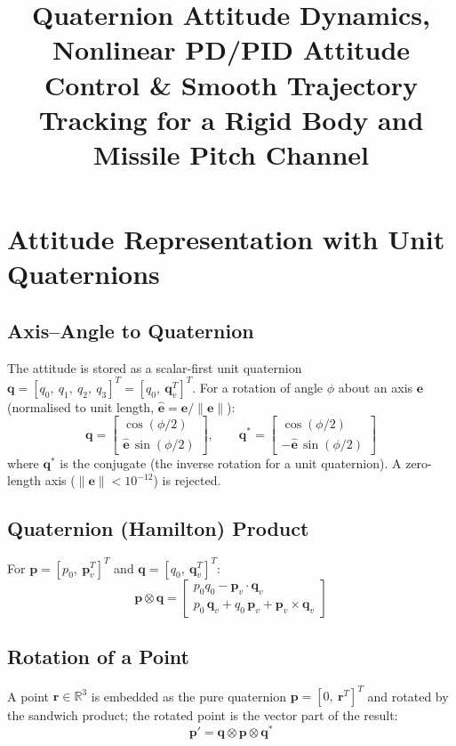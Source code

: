 \documentclass[11pt, a4paper]{article}
\title{\textbf{Quaternion Attitude Dynamics, Nonlinear PD/PID Attitude Control \& Smooth Trajectory Tracking for a Rigid Body and Missile Pitch Channel}}
\author{}
\date{}
\newcommand{\vect}[1]{\boldsymbol{#1}}
\newcommand{\qv}{\vect{q}_v}
\begin{document}
\maketitle

\section{Attitude Representation with Unit Quaternions}

\subsection{Axis--Angle to Quaternion}
The attitude is stored as a scalar-first unit quaternion $\vect{q} = [q_0,\ q_1,\ q_2,\ q_3]^T = [q_0,\ \qv^T]^T$. For a rotation of angle $\phi$ about an axis $\vect{e}$ (normalised to unit length, $\hat{\vect{e}} = \vect{e}/\lVert\vect{e}\rVert$):
\begin{equation}
\vect{q} = \begin{bmatrix} \cos(\phi/2) \\ \hat{\vect{e}}\,\sin(\phi/2) \end{bmatrix},
\qquad
\vect{q}^{*} = \begin{bmatrix} \cos(\phi/2) \\ -\hat{\vect{e}}\,\sin(\phi/2) \end{bmatrix}
\end{equation}
where $\vect{q}^{*}$ is the conjugate (the inverse rotation for a unit quaternion). A zero-length axis ($\lVert\vect{e}\rVert < 10^{-12}$) is rejected.

\subsection{Quaternion (Hamilton) Product}
For $\vect{p} = [p_0,\ \vect{p}_v^T]^T$ and $\vect{q} = [q_0,\ \qv^T]^T$:
\begin{equation}
\vect{p} \otimes \vect{q} =
\begin{bmatrix}
p_0 q_0 - \vect{p}_v \cdot \qv \\
p_0\,\qv + q_0\,\vect{p}_v + \vect{p}_v \times \qv
\end{bmatrix}
\end{equation}

\subsection{Rotation of a Point}
A point $\vect{r} \in \mathbb{R}^3$ is embedded as the pure quaternion $\vect{p} = [0,\ \vect{r}^T]^T$ and rotated by the sandwich product; the rotated point is the vector part of the result:
\begin{equation}
\vect{p}' = \vect{q} \otimes \vect{p} \otimes \vect{q}^{*}
\end{equation}
\end{document}
